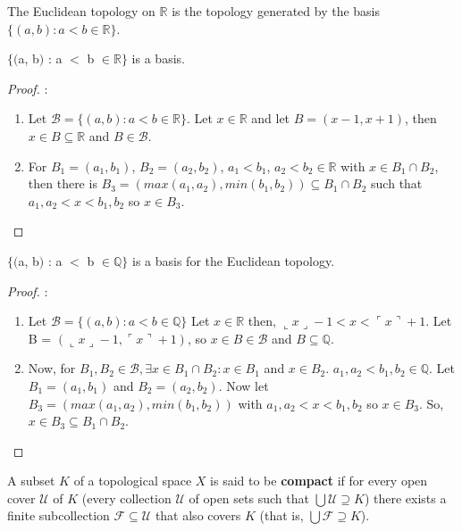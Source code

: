\documentclass{article}
\begin{document}
	\begin{definition}
	The Euclidean topology on $\mathbb{R}$ is the topology generated by the basis \newline $\lbrace(a, b) : a < b \in \mathbb{R}\rbrace$.
	\end{definition}

	\begin{theorem}
	$\lbrace($a, b$)$ : a $<$ b $\in \mathbb{R}\rbrace$ is a basis.
	\end{theorem}
	\begin{proof}:\newline
		\begin{enumerate}
			\item Let $\mathcal{B} = \lbrace (a, b) : a < b \in \mathbb{R} \rbrace$. Let $x \in \mathbb{R}$ and let $B = (x-1, x+1)$, then $x \in B \subseteq \mathbb{R}$ and $B \in \mathcal{B}$.	
			\item For $B_1 = (a_1, b_1)$, $B_2 = (a_2, b_2)$, $a_1<b_1$, $a_2<b_2 \in \mathbb{R}$ with $x \in B_1 \cap B_2$, then there is $B_3 = ( max(a_1, a_2), min(b_1, b_2) ) \subseteq B_1 \cap B_2$ such that $a_1,a_2<x<b_1,b_2$ so $ x \in B_3$.
		\end{enumerate}
	\end{proof}

	\begin{theorem}
	$\lbrace($a, b$)$ : a $<$ b $\in \mathbb{Q}\rbrace$ is a basis for the Euclidean topology.
	\end{theorem}
	\begin{proof}:\newline
		\begin{enumerate}
		\item Let $\mathcal{B} = \lbrace (a, b) : a < b \in \mathbb{Q}\rbrace$ Let $x \in \mathbb{R}$ then, $\llcorner x \lrcorner -1 < x < \ulcorner x \urcorner + 1$. Let B = $(\llcorner x \lrcorner -1, \ulcorner x \urcorner + 1)$, so $x \in B \in \mathcal{B}$ and $B \subseteq \mathbb{Q}$.
		\item Now, for $B_1, B_2 \in \mathcal{B}, \exists x \in B_1 \cap B_2 : x \in B_1$ and $x \in B_2$. $a_1, a_2 < b_1, b_2 \in \mathbb{Q}.$ Let $B_1 = (a_1, b_1)$ and $B_2 = (a_2, b_2)$. Now let $B_3 = (max(a_1,a_2), min(b_1,b_2))$ with $a_1,a_2<x<b_1,b_2$ so $x \in B_3$. So, $x \in B_3 \subseteq B_1 \cap B_2$.
		\end{enumerate} 
	\end{proof}

	\begin{definition}
	  A subset \(K\) of a topological space \(X\) is said to be \textbf{compact} if for every
	  open cover \(\mathcal U\) of \(K\) (every collection \(\mathcal U\) of open sets
	  such that \(\bigcup \mathcal U\supseteq K\)) there exists a finite subcollection
	  \(\mathcal F\subseteq \mathcal U\) that also covers \(K\) (that is,
	  \(\bigcup\mathcal F\supseteq K\)).
	\end{definition}
\end{document}
